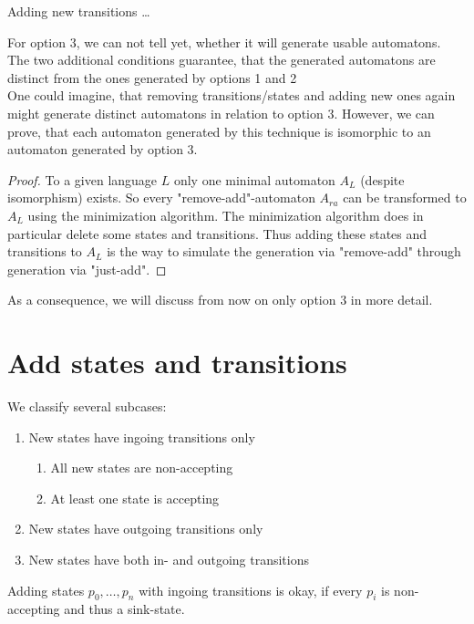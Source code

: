 \documentclass[a4paper, oneside, 11pt]{report}
\begin{document}
Adding new transitions \ldots

For option 3, we can not tell yet, whether it will generate usable automatons. The two additional conditions guarantee, that the generated automatons are distinct from the ones generated by options 1 and 2 \\

\noindent One could imagine, that removing transitions/states and adding new ones again might generate distinct automatons in relation to option 3. However, we can prove, that each automaton generated by this technique is isomorphic to an automaton generated by option 3.

\begin{proof}
	To a given language $L$ only one minimal automaton $A_L$ (despite isomorphism) exists.
	So every "remove-add"-automaton $A_{ra}$ can be transformed to $A_L$ using the minimization algorithm.
	The minimization algorithm does in particular delete some states and transitions.
	Thus adding these states and transitions to $A_L$ is the way to simulate the generation via "remove-add" through generation via "just-add".
\end{proof}
\noindent As a consequence, we will discuss from now on only option 3 in more detail.

\section{Add states and transitions}

We classify several subcases:

\begin{enumerate}
	\item New states have ingoing transitions only
	\begin{enumerate}
		\item All new states are non-accepting
		\item At least one state is accepting
	\end{enumerate}
	\item New states have outgoing transitions only
	\item New states have both in- and outgoing transitions
\end{enumerate}
Adding states $p_0, \ldots, p_n$ with ingoing transitions is okay, if every $p_i$ is non-accepting and thus a sink-state.
\end{document}
